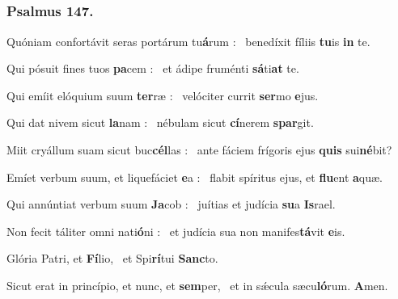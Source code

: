 \documentclass[12pt]{article} %
\newenvironment{psalmtext}{\leftskip 0.25in}{\vspace{2 mm}}
\let\oldgresixstar\gresixstar
\renewcommand{\gresixstar}{\textcolor{benred8}{\oldgresixstar}}
\let\oldAbar\Abar
\renewcommand{\Abar}{\textcolor{benred8}{\oldAbar .}}
\begin{document}
\vspace{2 mm}


\subsection*{}


\gresetfirstlineaboveinitial{\small \textsc{ \textbf{\textcolor{benred8}{5 \Abar\ E}}}}{\small \textsc{ \textbf{\textcolor{benred8}{5 \Abar\ E}}}}

\subsubsection*{Psalmus 147.}

\begin{psalmtext}
Quóniam confortávit seras portárum tu\textbf{á}rum : \gresixstar\ benedíxit fíliis \textbf{tu}is \textbf{in} te.

Qui pósuit fines tuos \textbf{pa}cem : \gresixstar\ et ádipe fruménti \textbf{sá}ti\textbf{at} te.

Qui emíit elóquium suum \textbf{ter}ræ : \gresixstar\ velóciter currit \textbf{ser}mo \textbf{e}jus.

Qui dat nivem sicut \textbf{la}nam : \gresixstar\ nébulam sicut \textbf{cí}nerem \textbf{spar}git.

Miit cryállum suam sicut buc\textbf{cél}las : \gresixstar\ ante fáciem frígoris ejus \textbf{quis} sui\textbf{né}bit?

Emíet verbum suum, et liquefáciet \textbf{e}a : \gresixstar\ flabit spíritus ejus, et \textbf{flu}ent \textbf{a}quæ.

Qui annúntiat verbum suum \textbf{Ja}cob : \gresixstar\ juítias et judícia \textbf{su}a \textbf{Is}rael.

Non fecit táliter omni nati\textbf{ó}ni : \gresixstar\ et judícia sua non manifes\textbf{tá}vit \textbf{e}is.

Glória Patri, et \textbf{Fí}lio, \gresixstar\ et Spi\textbf{rí}tui \textbf{Sanc}to.

Sicut erat in princípio, et nunc, et \textbf{sem}per, \gresixstar\ et in sǽcula sæcu\textbf{ló}rum. \textbf{A}men.

\end{psalmtext}
\end{document}
